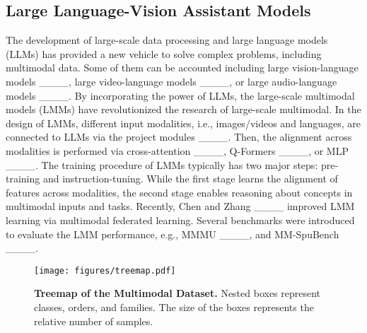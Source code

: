 \subsection{Large Language-Vision Assistant Models}

The development of large-scale data processing and large language models (LLMs) has provided a new vehicle to solve complex problems, including multimodal data. Some of them can be accounted including large vision-language models ____, large video-language models ____, or large audio-language models ____.
By incorporating the power of LLMs, the large-scale multimodal models (LMMs) have revolutionized the research of large-scale multimodal.
In the design of LMMs, different input modalities, i.e., images/videos and languages, are connected to LLMs via the project modules ____. Then, the alignment across modalities is performed via cross-attention ____, Q-Formers ____, or MLP ____.
The training procedure of LMMs typically has two major steps: pre-training and instruction-tuning.
While the first stage learns the alignment of features across modalities, the second stage enables reasoning about concepts in multimodal inputs and tasks.
Recently, Chen and Zhang ____ improved LMM learning via multimodal federated learning.
Several benchmarks were introduced to evaluate the LMM performance, e.g., MMMU ____, and
MM-SpuBench ____.



\begin{figure*}[!t]
\begin{center}
\texttt{[image: figures/treemap.pdf]}
\end{center}
\caption{\textbf{Treemap of the Multimodal Dataset.} Nested boxes represent classes, orders, and families. The size of the boxes represents the relative number of samples.}
\label{fig:treemap}
\vspace{-5mm}
\end{figure*}